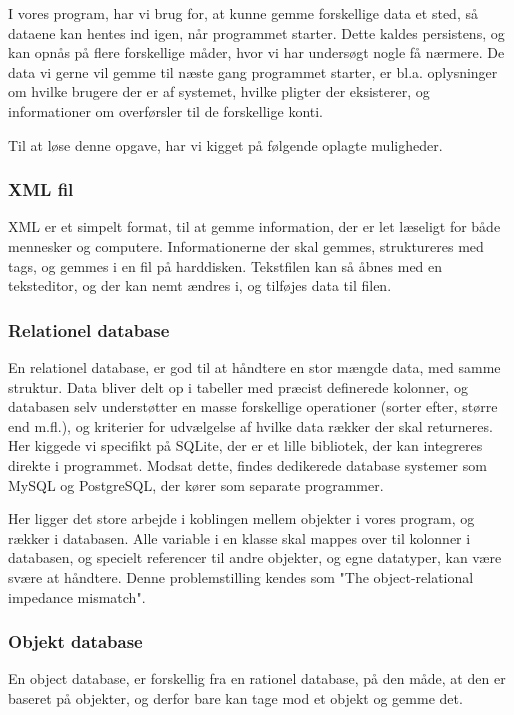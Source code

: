 I vores program, har vi brug for, at kunne gemme forskellige data et sted, så dataene kan hentes ind igen, når programmet starter. Dette kaldes persistens, og kan opnås på flere forskellige måder, hvor vi har undersøgt nogle få nærmere.
De data vi gerne vil gemme til næste gang programmet starter, er bl.a. oplysninger om hvilke brugere der er af systemet, hvilke pligter der eksisterer, og informationer om overførsler til de forskellige konti.

Til at løse denne opgave, har vi kigget på følgende oplagte muligheder.

\subsubsection{XML fil}
XML er et simpelt format, til at gemme information, der er let læseligt for både mennesker og computere. Informationerne der skal gemmes, struktureres med tags, og gemmes i en fil på harddisken\cite{xmlspecs}. Tekstfilen kan så åbnes med en teksteditor, og der kan nemt ændres i, og tilføjes data til filen.


\subsubsection{Relationel database}
En relationel database, er god til at håndtere en stor mængde data, med samme struktur. Data bliver delt op i tabeller med præcist definerede kolonner, og databasen selv understøtter en masse forskellige operationer (sorter efter, større end m.fl.), og kriterier for udvælgelse af hvilke data rækker der skal returneres. Her kiggede vi specifikt på SQLite, der er et lille bibliotek, der kan integreres direkte i programmet. Modsat dette, findes dedikerede database systemer som MySQL og PostgreSQL, der kører som separate programmer.

Her ligger det store arbejde i koblingen mellem objekter i vores program, og rækker i databasen. Alle variable i en klasse skal mappes over til kolonner i databasen, og specielt referencer til andre objekter, og egne datatyper, kan være svære at håndtere. Denne problemstilling kendes som "The object-relational impedance mismatch"\cite{ORIM}.

\subsubsection{Objekt database}
En object database,  er forskellig fra en rationel database, på den måde, at den er baseret på objekter, og derfor bare kan tage mod et objekt og gemme det.

